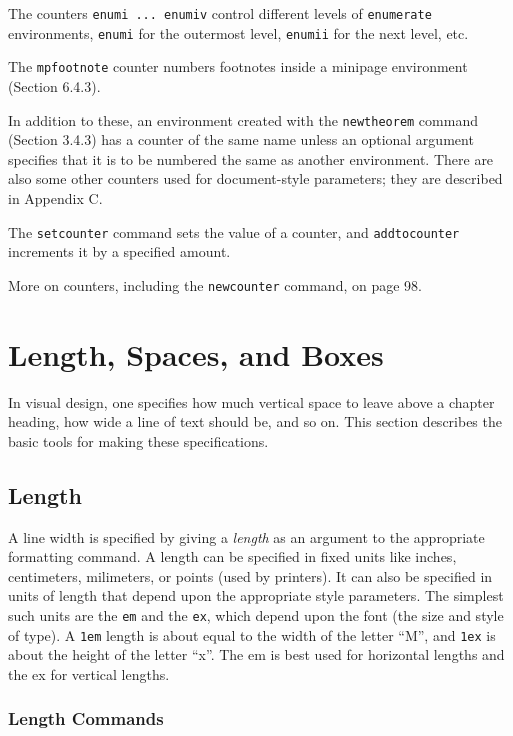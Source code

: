 \documentclass{article}
\begin{document}
The counters {\tt enumi ... enumiv} control different levels of {\tt enumerate} environments,
{\tt enumi} for the outermost level, {\tt enumii} for the next level, etc.

The {\tt mpfootnote} counter numbers footnotes inside a minipage environment (Section 6.4.3). 

In addition to these, an environment created with the \verb:newtheorem: command (Section 3.4.3) has
a counter of the same name unless an optional argument specifies that it is to be numbered the same
as another environment. There are also some other counters used for document-style parameters; they
are described in Appendix C.

The \verb:setcounter: command sets the value of a counter, and \verb:addtocounter: increments it by
a specified amount. 

More on counters, including the \verb:newcounter: command, on page 98.


\section{Length, Spaces, and Boxes}

In visual design, one specifies how much vertical space to leave above a chapter heading, how wide a
line of text should be, and so on. This section describes the basic tools for making these
specifications.

\subsection{Length}

A line width is specified by giving a \emph{length} as an argument to the appropriate formatting
command. A length can be specified in fixed units like inches, centimeters, milimeters, or points
(used by printers). It can also be specified in units of length that depend upon the appropriate
style parameters. The simplest such units are the {\tt em} and the {\tt ex}, which depend upon the
font (the size and style of type). A {\tt 1em} length is about equal to the width of the letter
``M'', and {\tt 1ex} is about the height of the letter ``x''. The em is best used for horizontal
lengths and the ex for vertical lengths.

\subsubsection{Length Commands}
\end{document}
